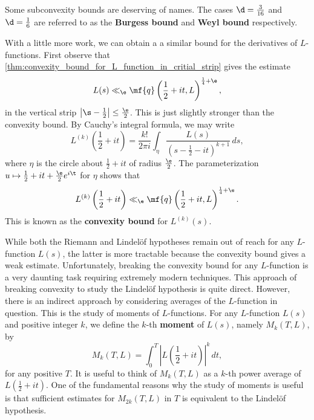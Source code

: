 \documentclass[12pt]{article}
\begin{document}
      \begin{remark}
        Some subconvexity bounds are deserving of names. The cases \(\d = \frac{3}{16}\) and \(\d = \frac{1}{6}\) are referred to as the \textbf{Burgess bound} and \textbf{Weyl bound} respectively.
      \end{remark}
      
      With a little more work, we can obtain a a similar bound for the derivatives of \(L\)-functions. First observe that \cref{thm:convexity_bound_for_L_function_in_critial_strip} gives the estimate
      \[
        L(s) \ll_{\e} \mf{q}\left(\frac{1}{2}+it,L\right)^{\frac{1}{4}+\e},
      \]
      in the vertical strip \(\left|\s-\frac{1}{2}\right| \le \frac{\e}{2}\). This is just slightly stronger than the convexity bound. By Cauchy's integral formula, we may write
      \[
        L^{(k)}\left(\frac{1}{2}+it\right) = \frac{k!}{2\pi i}\int_{\eta}\frac{L(s)}{(s-\frac{1}{2}-it)^{k+1}}\,ds,
      \]
      where \(\eta\) is the circle about \(\frac{1}{2}+it\) of radius \(\frac{\e}{2}\). The parameterization \(u \mapsto \frac{1}{2}+it+\frac{\e}{2}e^{i\t}\) for \(\eta\) shows that
      \[
        L^{(k)}\left(\frac{1}{2}+it\right) \ll_{\e} \mf{q}\left(\frac{1}{2}+it,L\right)^{\frac{1}{4}+\e}.
      \]
      This is known as the \textbf{convexity bound} for \(L^{(k)}(s)\).

      While both the Riemann and Lindel\"of hypotheses remain out of reach for any \(L\)-function \(L(s)\), the latter is more tractable because the convexity bound gives a weak estimate. Unfortunately, breaking the convexity bound for any \(L\)-function is a very daunting task requiring extremely modern techniques. This approach of breaking convexity to study the Lindel\"of hypothesis is quite direct. However, there is an indirect approach by considering averages of the \(L\)-function in question. This is the study of moments of \(L\)-functions. For any \(L\)-function \(L(s)\) and positive integer \(k\), we define the \(k\)-th \textbf{moment} of \(L(s)\), namely \(M_{k}(T,L)\), by
      \[
        M_{k}(T,L) = \int_{0}^{T}\left|L\left(\frac{1}{2}+it\right)\right|^{k}\,dt,
      \]
      for any positive \(T\). It is useful to think of \(M_{k}(T,L)\) as a \(k\)-th power average of \(L\left(\frac{1}{2}+it\right)\). One of the fundamental reasons why the study of moments is useful is that sufficient estimates for \(M_{2k}(T,L)\) in \(T\) is equivalent to the Lindel\"of hypothesis.
\end{document}
